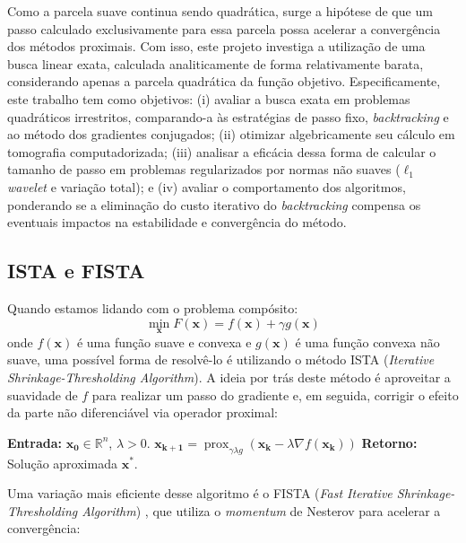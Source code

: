 \documentclass[12pt]{article}
\begin{document}
Como a parcela suave continua sendo quadrática, surge a hipótese de que um passo calculado exclusivamente para essa parcela possa acelerar a convergência dos métodos proximais. Com isso, este projeto investiga a utilização de uma busca linear exata, calculada analiticamente de forma relativamente barata, considerando apenas a parcela quadrática da função objetivo. Especificamente, este trabalho tem como objetivos: (i) avaliar a busca exata em problemas quadráticos irrestritos, comparando-a às estratégias de passo fixo, \textit{backtracking} e ao método dos gradientes conjugados; (ii) otimizar algebricamente seu cálculo em tomografia computadorizada; (iii) analisar a eficácia dessa forma de calcular o tamanho de passo em problemas regularizados por normas não suaves ($\ell_1$ \textit{wavelet} e variação total); e (iv) avaliar o comportamento dos algoritmos, ponderando se a eliminação do custo iterativo do \textit{backtracking} compensa os eventuais impactos na estabilidade e convergência do método.

\subsection{ISTA e FISTA}
\label{problema}
Quando estamos lidando com o problema compósito:
\[
\min_{\mathbf{x}} F(\mathbf{x}) = f(\mathbf{x}) + \gamma g(\mathbf{x})
\]
onde $f(\mathbf{x})$ é uma função suave e convexa e $g(\mathbf{x})$ é uma função convexa não suave, uma possível forma de resolvê-lo é utilizando o método ISTA (\textit{Iterative Shrinkage-Thresholding Algorithm}). A ideia por trás deste método é aproveitar a suavidade de $f$ para realizar um passo do gradiente e, em seguida, corrigir o efeito da parte não diferenciável via operador proximal:

\begin{algorithm}[H]
\caption{ISTA}
\begin{algorithmic}[1]
\State \textbf{Entrada:} $\mathbf{x_0} \in \mathbb{R}^n$, $\lambda > 0$.
    \State $\mathbf{x_{k+1}} = \operatorname{prox}_{\gamma \lambda g} ( \mathbf{x_k} - \lambda \nabla f( \mathbf{x_k} ) )$
\EndFor
\State \textbf{Retorno:} Solução aproximada $\mathbf{x^*}$.
\end{algorithmic}
\end{algorithm}

Uma variação mais eficiente desse algoritmo é o FISTA (\textit{Fast Iterative Shrinkage-Thresholding Algorithm}) \cite{bet09}, que utiliza o \textit{momentum} de Nesterov para acelerar a convergência:
\end{document}
